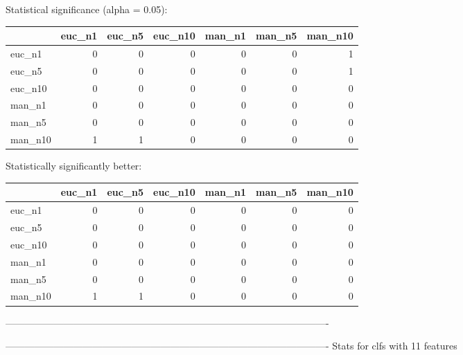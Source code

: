 Statistical significance (alpha = 0.05):
 \begin{tabular}{lrrrrrr}
\hline
         &   euc\_n1 &   euc\_n5 &   euc\_n10 &   man\_n1 &   man\_n5 &   man\_n10 \\
\hline
 euc\_n1  &        0 &        0 &         0 &        0 &        0 &         1 \\
 euc\_n5  &        0 &        0 &         0 &        0 &        0 &         1 \\
 euc\_n10 &        0 &        0 &         0 &        0 &        0 &         0 \\
 man\_n1  &        0 &        0 &         0 &        0 &        0 &         0 \\
 man\_n5  &        0 &        0 &         0 &        0 &        0 &         0 \\
 man\_n10 &        1 &        1 &         0 &        0 &        0 &         0 \\
\hline
\end{tabular} 

Statistically significantly better:
 \begin{tabular}{lrrrrrr}
\hline
         &   euc\_n1 &   euc\_n5 &   euc\_n10 &   man\_n1 &   man\_n5 &   man\_n10 \\
\hline
 euc\_n1  &        0 &        0 &         0 &        0 &        0 &         0 \\
 euc\_n5  &        0 &        0 &         0 &        0 &        0 &         0 \\
 euc\_n10 &        0 &        0 &         0 &        0 &        0 &         0 \\
 man\_n1  &        0 &        0 &         0 &        0 &        0 &         0 \\
 man\_n5  &        0 &        0 &         0 &        0 &        0 &         0 \\
 man\_n10 &        1 &        1 &         0 &        0 &        0 &         0 \\
\hline
\end{tabular} 

----------------------------------------------------------------------------------------------------



----------------------------------------------------------------------------------------------------
Stats for clfs with 11 features


